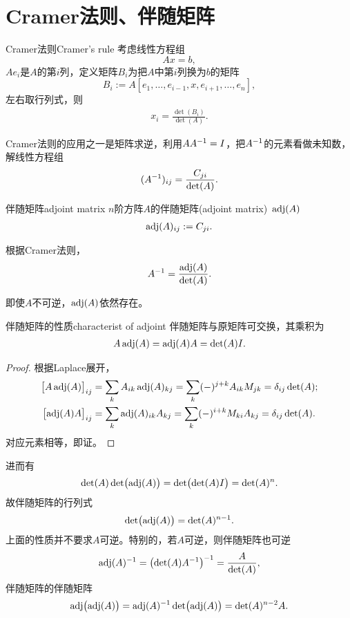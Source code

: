 \section{Cramer法则、伴随矩阵}
\begin{theorem}{Cramer法则}{Cramer's rule}
	考虑线性方程组
	\[
		Ax=b,
	\]
	$Ae_i$是$A$的第$i$列，定义矩阵$B_i$为把$A$中第$i$列换为$b$的矩阵 
	\[
		B_i:=A[e_1,\ldots,e_{i-1},x,e_{i+1},\ldots,e_n],
	\]
	左右取行列式，则
	\begin{align}
		x_i=\frac{\det(B_i)}{\det(A)}.
	\end{align}
\end{theorem}
Cramer法则的应用之一是矩阵求逆，利用$AA^{-1}=I$，把$A^{-1}$的元素看做未知数，解线性方程组
\[
	(A^{-1})_{ij}=\frac{C_{ji}}{\det(A)}.
\]
\begin{definition}{伴随矩阵}{adjoint matrix}
	$n$阶方阵$A$的伴随矩阵(adjoint matrix)~$\operatorname{adj}(A)$
	\begin{align}
		\operatorname{adj}(A)_{ij}:=C_{ji}.
	\end{align}
\end{definition}
根据Cramer法则，
\begin{align}
	A^{-1}=\frac{\operatorname{adj}(A)}{\det(A)}.
\end{align}
\begin{remark}
	即使$A$不可逆，$\operatorname{adj}(A)$依然存在。
\end{remark}
\begin{theorem}{伴随矩阵的性质}{characterist of adjoint}
	伴随矩阵与原矩阵可交换，其乘积为
	\begin{align}
		A\operatorname{adj}(A)=\operatorname{adj}(A)A=\det(A)I.
	\end{align}
\end{theorem}
\begin{proof}
	根据Laplace展开，
	\begin{align*}
		\bigfkh{A\adj(A)}_{ij}&=\sum_{k}A_{ik}\adj(A)_{kj}=\sum_{k}(-)^{j+k}A_{ik}M_{jk}=\vd_{ij}\det(A);\\
		\bigfkh{\adj(A)A}_{ij}&=\sum_{k}\adj(A)_{ik}A_{kj}=\sum_{k}(-)^{i+k}M_{ki}A_{kj}=\vd_{ij}\det(A).%
	\end{align*}
	对应元素相等，即证。
\end{proof}
\begin{corollary}
	进而有
	\[
		\det(A)\det\bigl(\operatorname{adj}(A)\bigr)=\det\bigl(\det(A)I\bigr)=\det(A)^n.
	\]
	故伴随矩阵的行列式
	\begin{align}
		\det\bigl(\operatorname{adj}(A)\bigr)=\det(A)^{n-1}.
	\end{align}
	上面的性质并不要求$A$可逆。特别的，若$A$可逆，则伴随矩阵也可逆
	\begin{align}
		\operatorname{adj}(A)^{-1}=\bigl(\det(A)A^{-1}\bigr)^{-1}=\frac{A}{\det(A)},
	\end{align}
	伴随矩阵的伴随矩阵
	\begin{align}
		\operatorname{adj}\bigl(\operatorname{adj}(A)\bigr)=\operatorname{adj}(A)^{-1}\det\bigl(\operatorname{adj}(A)\bigr)=\det(A)^{n-2}A.
	\end{align}
\end{corollary}

